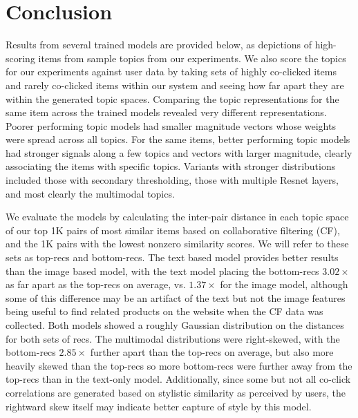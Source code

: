 \documentclass[10pt,twocolumn,letterpaper]{article}
\begin{document}
\section{Conclusion}
Results from several trained models are provided below, as depictions of high-scoring items from sample topics from our experiments.  We also score the topics for our experiments against user data by taking sets of highly co-clicked items and rarely co-clicked items within our system and seeing how far apart they are within the generated topic spaces. Comparing the topic representations for the same item across the trained models revealed very different representations. Poorer performing topic models had smaller magnitude vectors whose weights were spread across all topics. For the same items, better performing topic models had stronger signals along a few topics and vectors with larger magnitude, clearly associating the items with specific topics. Variants with stronger distributions included those with secondary thresholding, those with multiple Resnet layers, and most clearly the multimodal topics.

We evaluate the models by calculating the inter-pair distance in each topic space of our top 1K pairs of most similar items based on collaborative filtering (CF), and the 1K pairs with the lowest nonzero similarity scores. We will refer to these sets as top-recs and bottom-recs. The text based model provides better results than the image based model, with the text model placing the bottom-recs $3.02\times$ as far apart as the top-recs on average, vs. $1.37\times$ for the image model, although some of this difference may be an artifact of the text but not the image features being useful to find related products on the website when the CF data was collected. Both models showed a roughly Gaussian distribution on the distances for both sets of recs. The multimodal distributions were right-skewed, with the bottom-recs $2.85\times$ further apart than the top-recs on average, but also more heavily skewed than the top-recs so more bottom-recs were further away from the top-recs than in the text-only model. Additionally, since some but not all co-click correlations are generated based on stylistic similarity as perceived by users, the rightward skew itself may indicate better capture of style by this model. 


\end{document}
